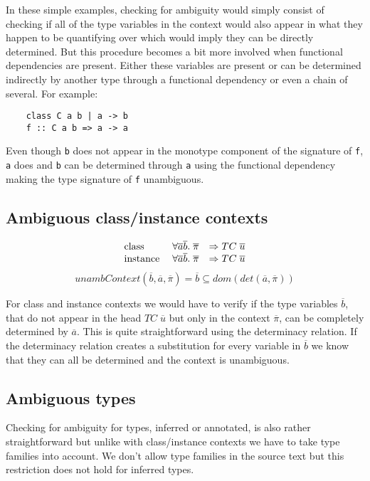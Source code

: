 In these simple examples, checking for ambiguity would simply consist of
checking if all of the type variables in the context would also appear in what
they happen to be quantifying over which would imply they can be directly
determined. But this procedure becomes a bit more involved when functional
dependencies are present. Either these variables are present or can be
determined indirectly by another type through a functional dependency or even a
chain of several. For example:
\begin{verbatim}
    class C a b | a -> b
    f :: C a b => a -> a
\end{verbatim}

Even though \texttt{b} does not appear in the monotype component of the
signature of \texttt{f}, \texttt{a} does and \texttt{b} can be determined
through \texttt{a} using the functional dependency making the type signature of
\texttt{f} unambiguous.

\subsection{Ambiguous class/instance contexts}

\[
\begin{array}{l l l}
\text{class} \; &\forall \overline{a} \overline{b}. \; \overline{\pi}
&\Rightarrow TC \; \overline{u}
\\
\text{instance} \; &\forall \overline{a} \overline{b}. \; \overline{\pi}
&\Rightarrow TC \; \overline{u}
\end{array}
\]
\[
unambContext(\overline{b},\overline{a},\overline{\pi}) = \overline{b} \subseteq
dom(det(\overline{a},\overline{\pi}))
\]

For class and instance contexts we would have to verify if the type variables
$\overline{b}$, that do not appear in the head $TC \; \overline{u}$ but only in
the context $\overline{\pi}$, can be completely determined by $\overline{a}$.
This is quite straightforward using the determinacy relation. If the determinacy
relation creates a substitution for every variable in $\overline{b}$ we know
that they can all be determined and the context is unambiguous.

\subsection{Ambiguous types}

Checking for ambiguity for types, inferred or annotated, is also rather
straightforward but unlike with class/instance contexts we have to take type
families into account. We don't allow type families in the source text but this
restriction does not hold for inferred types.

